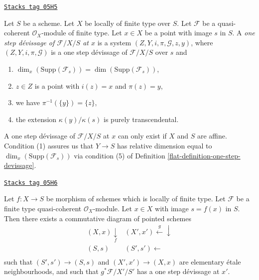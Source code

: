 \begin{definition}
\label{flat-definition-one-step-devissage-at-x}
\href{https://stacks.math.columbia.edu/tag/05H5}{\texttt{Stacks tag 05H5}}

Let $S$ be a scheme.
Let $X$ be locally of finite type over $S$.
Let $\mathcal{F}$ be a quasi-coherent $\mathcal{O}_X$-module of finite type.
Let $x \in X$ be a point with image $s$ in $S$.
A {\it one step d\'evissage of $\mathcal{F}/X/S$ at $x$}
is a system $(Z, Y, i, \pi, \mathcal{G}, z, y)$, where
$(Z, Y, i, \pi, \mathcal{G})$ is a one step d\'evissage of
$\mathcal{F}/X/S$ over $s$ and
\begin{enumerate}
\item $\dim_x(\text{Supp}(\mathcal{F}_s)) = \dim(\text{Supp}(\mathcal{F}_s))$,
\item $z \in Z$ is a point with $i(z) = x$ and $\pi(z) = y$,
\item we have $\pi^{-1}(\{y\}) = \{z\}$,
\item the extension $\kappa(y)/\kappa(s)$ is purely
transcendental.
\end{enumerate}
\end{definition}

A one step d\'evissage of $\mathcal{F}/X/S$ at $x$ can only exist if
$X$ and $S$ are affine. Condition (1) assures us that $Y \to S$ has
relative dimension equal to $\dim_x(\text{Supp}(\mathcal{F}_s))$
via condition (5) of
Definition \ref{flat-definition-one-step-devissage}.

\begin{lemma}
\label{flat-lemma-elementary-devissage-variant}
\href{https://stacks.math.columbia.edu/tag/05H6}{\texttt{Stacks tag 05H6}}

Let $f : X \to S$ be morphism of schemes which is locally of finite type.
Let $\mathcal{F}$ be a finite type quasi-coherent $\mathcal{O}_X$-module.
Let $x \in X$ with image $s = f(x)$ in $S$.
Then there exists a commutative diagram of pointed schemes
$$
\begin{array}{cc}(X, x) \underset{f}{\downarrow} & (X', x') \overset{g}{\longleftarrow}\downarrow \\ (S, s) & (S', s') \longleftarrow \\  & \end{array}
$$
such that $(S', s') \to (S, s)$ and $(X', x') \to (X, x)$
are elementary \'etale neighbourhoods, and such that
$g^*\mathcal{F}/X'/S'$ has a one step d\'evissage at $x'$.
\end{lemma}

